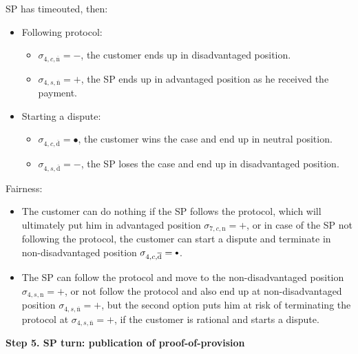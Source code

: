 \documentclass{ieeeaccess}
\newcommand\sbullet[1][.75]{\mathbin{\ThisStyle{\vcenter{\hbox{%
  \scalebox{#1}{$\SavedStyle\bullet$}}}}}%
}
\begin{document}
SP has timeouted, then:

\begin{itemize}
\item
  Following protocol:

  \begin{itemize}
  
  \item
    \(\sigma_{4, c, \overline{\mathrm{n}}} = -\), the customer ends up in
    disadvantaged position.
  \item
    \(\sigma_{4, s, \overline{\mathrm{n}}} = +\), the SP ends up in
    advantaged position as he received the payment.
  \end{itemize}
\item
  Starting a dispute:

  \begin{itemize}
  
  \item
    \(\sigma_{4, c, \overline{\mathrm{d}}} = •\), the customer wins the
    case and end up in neutral position.
  \item
    \(\sigma_{4, s, \overline{\mathrm{d}}} = -\), the SP loses the case
    and end up in disadvantaged position.
  \end{itemize}
\end{itemize}

Fairness:

\begin{itemize}

\item
  The customer can do nothing if the SP follows the protocol, which will
  ultimately put him in advantaged position
  \(\sigma_{7, c, \mathrm{n}} = +\), or in case of the SP not following
  the protocol, the customer can start a dispute and terminate in
  non-disadvantaged position
  \(\sigma_{4, c, \overline{\mathrm{d}}} = \sbullet\).
\item
  The SP can follow the protocol and move to the non-disadvantaged
  position \(\sigma_{4, s, \mathrm{n}} = +\), or not follow the protocol
  and also end up at non-disadvantaged position
  \(\sigma_{4, s, \overline{\mathrm{n}}} = +\), but the second option
  puts him at risk of terminating the protocol at
  \(\sigma_{4, s, \overline{\mathrm{n}}} = +\), if the customer is
  rational and starts a dispute.
\end{itemize}

\noindent \textbf
{Step 5. SP turn: publication of proof-of-provision}\label{step-5-publication-of-proof-of-provision}
\end{document}
